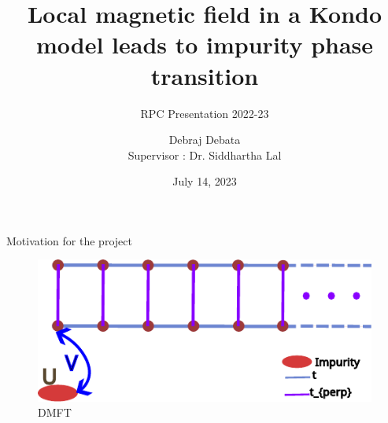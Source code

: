 \documentclass{beamer}
\title{Local magnetic field in a Kondo model leads to impurity phase transition}
\subtitle{RPC Presentation 2022-23}
\author{{Debraj Debata \\[1mm]{\small Supervisor : Dr. Siddhartha Lal}}}
\date{July 14, 2023}
\begin{document}
\maketitle




\begin{frame}{Motivation for the project}
\begin{figure}[!ht]
    \centering
    \includegraphics[scale=1.2]{3-orbital-DMFT.pdf}
    \caption{DMFT}
\end{figure}
\end{frame}
\end{document}
